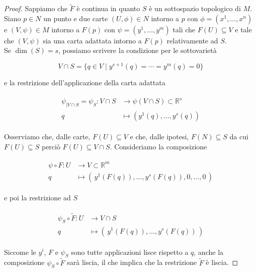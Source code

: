 \begin{proof}
	Sappiamo che $ \tilde{F} $ è continua in quanto $ S $ è un sottospazio topologico di $ M $.\\
	Siano $ p \in N $ un punto e due carte $ (U,\phi) \in N $ intorno a $ p $ con $ \phi = (x^{1},\dots,x^{n}) $ e $ (V,\psi) \in M $ intorno a $ F(p) $ con $ \psi = (y^{1},\dots,y^{m}) $ tali che $ F(U) \subseteq V $ e tale che $ (V,\psi) $ sia una carta adattata intorno a $ F(p) $ relativamente ad $ S $.\\
	Se $ \dim(S)=s $, possiamo scrivere la condizione per le sottovarietà
	
	\begin{equation}
		V \cap S = \{ q \in V \mid y^{s+1}(q) = \cdots = y^{m}(q) = 0 \}
	\end{equation}

	e la restrizione dell'applicazione della carta adattata
	
	\begin{align}
		\begin{split}
			\psi_{|V \cap S} = \psi_{S} : V \cap S &\to \psi(V \cap S) \subset \mathbb{R}^{s}\\
			q &\mapsto (y^{1}(q),\dots,y^{s}(q))
		\end{split}
	\end{align}

	Osserviamo che, dalle carte, $ F(U) \subseteq V $ e che, dalle ipotesi, $ F(N) \subseteq S $ da cui $ F(U) \subseteq S $ perciò $ F(U) \subseteq V \cap S $. Consideriamo la composizione
	
	\begin{align}
		\begin{split}
			\psi \circ F : U &\to V \subset \mathbb{R}^{m}\\
			q &\mapsto ( \, y^{1}(F(q)), \dots, y^{s}(F(q)), 0,\dots, 0 \, )
		\end{split}
	\end{align}

	e poi la restrizione ad $ S $
	
	\begin{align}
		\begin{split}
			\psi_{S} \circ \tilde{F} : U &\to V \cap S\\
			q &\mapsto ( \, y^{1}(F(q)), \dots, y^{s}(F(q)) \, )
		\end{split}
	\end{align}

	Siccome le $ y^{i} $, $ F $ e $ \psi_{S} $ sono tutte applicazioni lisce rispetto a $ q $, anche la composizione $ \psi_{S} \circ \tilde{F} $ sarà liscia, il che implica che la restrizione $ \tilde{F} $ è liscia.
\end{proof}

